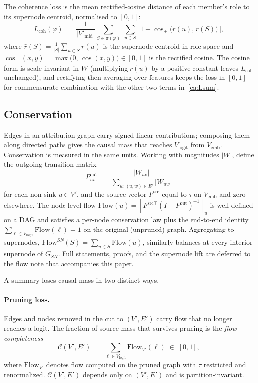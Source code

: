 The coherence loss is the mean rectified-cosine distance of each
member's role to its supernode centroid, normalised to $[0, 1]$:
\begin{equation}
L_{\text{coh}}(\varphi)
\;=\;
\frac{1}{|V'_{\text{mid}}|}
\sum_{S \in \pi(\varphi)}\; \sum_{u \in S}
\bigl[\,1 - \cos_{+}\!\bigl(r(u),\, \bar r(S)\bigr)\,\bigr],
\label{eq:Lcoh}
\end{equation}
where $\bar r(S) = \frac{1}{|S|}\sum_{u \in S} r(u)$ is the supernode
centroid in role space and $\cos_{+}(x, y) = \max\!\bigl(0,\, \cos(x,
y)\bigr) \in [0, 1]$ is the rectified cosine. The cosine form is
scale-invariant in $W$ (multiplying $r(u)$ by a positive constant
leaves $L_{\text{coh}}$ unchanged), and rectifying then averaging over
features keeps the loss in $[0, 1]$ for commensurate combination with
the other two terms in~\eqref{eq:Lsum}.

\subsection{Conservation}\label{sec:attr-cons}

Edges in an attribution graph carry signed linear contributions;
composing them along directed paths gives the causal mass that reaches
$V_{\text{logit}}$ from $V_{\text{emb}}$. Conservation is measured in
the same units. Working with magnitudes $|W|$, define the outgoing
transition matrix
\begin{equation}
P^{\text{out}}_{uv}
\;=\;
\frac{|W_{uv}|}{\sum_{w : (u, w) \in E'} |W_{uw}|}
\label{eq:Pout-reform}
\end{equation}
for each non-sink $u \in V'$, and the source vector $F^{\text{src}}$
equal to $\tau$ on $V_{\text{emb}}$ and zero elsewhere. The node-level
flow $\mathrm{Flow}(u) = [F^{\text{src}\top}(I - P^{\text{out}})^{-1}]_u$
is well-defined on a DAG and satisfies a per-node conservation law plus
the end-to-end identity $\sum_{\ell \in V_{\text{logit}}} \mathrm{Flow}(\ell)
= 1$ on the original (unpruned) graph. Aggregating to supernodes,
$\mathrm{Flow}^{SN}(S) = \sum_{u \in S} \mathrm{Flow}(u)$, similarly
balances at every interior supernode of $G_{SN}$. Full statements,
proofs, and the supernode lift are deferred to the flow note that
accompanies this paper.

A summary loses causal mass in two distinct ways.

\paragraph{Pruning loss.}
Edges and nodes removed in the cut to $(V', E')$ carry flow that no
longer reaches a logit. The fraction of source mass that survives
pruning is the \emph{flow completeness}
\begin{equation}
\mathcal{C}(V', E')
\;=\;
\sum_{\ell \in V_{\text{logit}}} \mathrm{Flow}_{V'}(\ell)
\;\in\; [0, 1],
\label{eq:Ccal}
\end{equation}
where $\mathrm{Flow}_{V'}$ denotes flow computed on the pruned graph
with $\tau$ restricted and renormalized. $\mathcal{C}(V', E')$ depends
only on $(V', E')$ and is partition-invariant.

